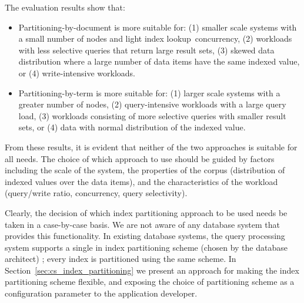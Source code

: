 



The evaluation results show that:
\begin{itemize}

  \item Partitioning-by-document is more suitable for:
  (1) smaller scale systems with a small number of nodes and light index lookup concurrency,
  (2) workloads with less selective queries that return large result sets,
  (3) skewed data distribution where a large number of data items have the same indexed value,
  or (4) write-intensive workloads.

  \item Partitioning-by-term is more suitable for:
  (1) larger scale systems with a greater number of nodes,
  (2) query-intensive workloads with a large query load,
  (3) workloads consisting of more selective queries with smaller result sets,
  or (4) data with normal distribution of the indexed value.

\end{itemize}

From these results, it is evident that neither of the two approaches is suitable for all needs.
The choice of which approach to use should be guided by factors including the scale of the system,
the properties of the corpus (distribution of indexed values over the data items),
and the characteristics of the workload (query/write ratio, concurrency, query selectivity).

Clearly, the decision of which index partitioning approach to be used needs be taken in a case-by-case basis.
We are not aware of any database system that provides this functionality.
In existing database systems,
the query processing system supports a single in index partitioning scheme (chosen by the database architect) \cite{kejriwal:slik, tan:diffindex, riakv:secondaryindexes, cassandra:secondaryindexing};
every index is partitioned using the same scheme.
In Section~\ref{sec:cs_index_partitioning} we present an approach for making the index partitioning scheme flexible,
and exposing the choice of partitioning scheme as a configuration parameter to the application developer.

